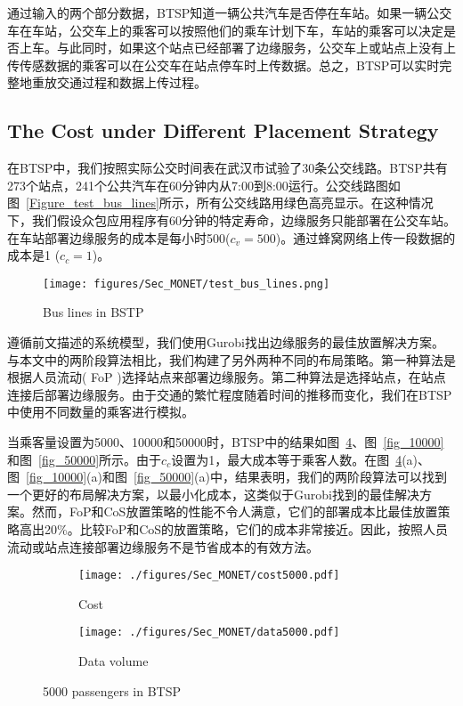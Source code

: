 通过输入的两个部分数据，BTSP知道一辆公共汽车是否停在车站。如果一辆公交车在车站，公交车上的乘客可以按照他们的乘车计划下车，车站的乘客可以决定是否上车。与此同时，如果这个站点已经部署了边缘服务，公交车上或站点上没有上传传感数据的乘客可以在公交车在站点停车时上传数据。总之，BTSP可以实时完整地重放交通过程和数据上传过程。

\subsection{The Cost under Diﬀerent Placement Strategy}

在BTSP中，我们按照实际公交时间表在武汉市试验了30条公交线路。BTSP共有273个站点，241个公共汽车在60分钟内从7:00到8:00运行。公交线路图如图~\ref{Figure_test_bus_lines}所示，所有公交线路用绿色高亮显示。在这种情况下，我们假设众包应用程序有60分钟的特定寿命，边缘服务只能部署在公交车站。在车站部署边缘服务的成本是每小时500($c_v = 500$)。通过蜂窝网络上传一段数据的成本是1 ($c_c = 1$)。

\begin{figure}[!h]
\centering
\vspace{-1em}
\texttt{[image: figures/Sec\_MONET/test\_bus\_lines.png]}
\vspace{-0.5em}
\caption{Bus lines in BSTP}
\label{Figure_test_bus_lines 用白底图}
\end{figure}

遵循前文描述的系统模型，我们使用Gurobi找出边缘服务的最佳放置解决方案。与本文中的两阶段算法相比，我们构建了另外两种不同的布局策略。第一种算法是根据人员流动( FoP )选择站点来部署边缘服务。第二种算法是选择站点，在站点连接后部署边缘服务。由于交通的繁忙程度随着时间的推移而变化，我们在BTSP中使用不同数量的乘客进行模拟。

当乘客量设置为5000、10000和50000时，BTSP中的结果如图~\ref{fig_5000}、图~\ref{fig_10000}和图~\ref{fig_50000}所示。由于$c_c$设置为1，最大成本等于乘客人数。在图~\ref{fig_5000}(a)、图~\ref{fig_10000}(a)和图~\ref{fig_50000}(a)中，结果表明，我们的两阶段算法可以找到一个更好的布局解决方案，以最小化成本，这类似于Gurobi找到的最佳解决方案。然而，FoP和CoS放置策略的性能不令人满意，它们的部署成本比最佳放置策略高出20\%。比较FoP和CoS的放置策略，它们的成本非常接近。因此，按照人员流动或站点连接部署边缘服务不是节省成本的有效方法。

\begin{figure}[!h]
  \centering
  \begin{subfigure}[b]{0.45\linewidth}
    \texttt{[image: ./figures/Sec\_MONET/cost5000.pdf]}
    \label{fig_cost5000}
    \caption{Cost}
  \end{subfigure}
  \begin{subfigure}[b]{0.45\linewidth}
    \texttt{[image: ./figures/Sec\_MONET/data5000.pdf]}
    \label{fig_data5000}
    \caption{Data volume}
  \end{subfigure}
  \caption{5000 passengers in BTSP}
  \label{fig_5000}
\end{figure}

